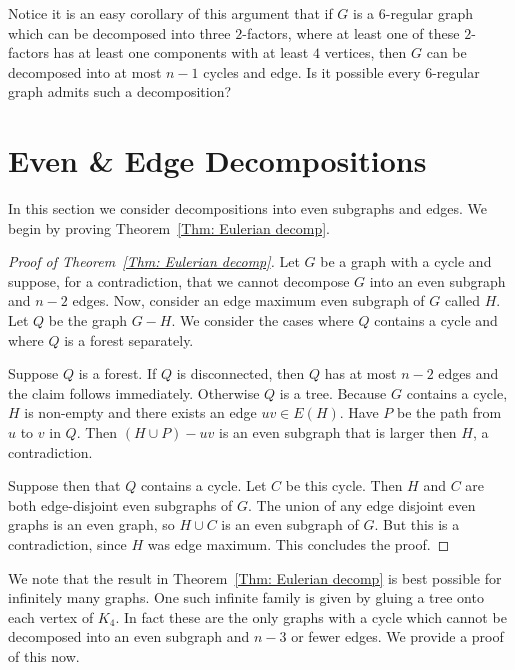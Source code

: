 \documentclass[11pt]{amsart}
\theoremstyle{definition}
\begin{document}
Notice it is an easy corollary of this argument
that if $G$ is a $6$-regular graph which can be decomposed into three $2$-factors, where at least one of these $2$-factors has at least one components with at least $4$ vertices, then $G$ can be decomposed into at most $n-1$ cycles and edge.
Is it possible every $6$-regular graph admits such a decomposition?


\section{Even \& Edge Decompositions}
\label{Sec: Eulerian and edges}


In this section we consider decompositions into even subgraphs and edges.
We begin by proving Theorem~\ref{Thm: Eulerian decomp}.


\begin{proof}[Proof of Theorem~\ref{Thm: Eulerian decomp}]
    Let $G$ be a graph with a cycle and suppose, for a contradiction, that we cannot decompose $G$ into an even subgraph and $n-2$ edges. 
    Now, consider an edge maximum even subgraph of $G$ called $H$.
    Let $Q$ be the graph $G-H$. We consider the cases where $Q$ contains a cycle and where $Q$ is a forest separately.
    
    Suppose $Q$ is a forest.
    If $Q$ is disconnected, then $Q$ has at most $n-2$ edges and the claim follows immediately.
    Otherwise $Q$ is a tree.
    Because $G$ contains a cycle, $H$ is non-empty and there exists an edge $uv\in E(H)$. 
    Have $P$ be the path from $u$ to $v$ in $Q$. Then $(H\cup P)- uv$ is an even subgraph that is larger then $H$, a contradiction.

    Suppose then that $Q$ contains a cycle.
    Let $C$ be this cycle.
    Then $H$ and $C$ are both edge-disjoint even subgraphs of $G$.
    The union of any edge disjoint even graphs is an even graph,
    so $H\cup C$ is an even subgraph of $G$.
    But this is a contradiction, since $H$ was edge maximum.
    This concludes the proof.
\end{proof}


We note that the result in Theorem~\ref{Thm: Eulerian decomp} is best possible for infinitely many 
graphs.
One such infinite family is given by gluing a tree onto each vertex of $K_4$.
In fact these are the only graphs with a cycle which cannot be decomposed into an even subgraph and $n-3$ or fewer edges.
We provide a proof of this now.
\end{document}
